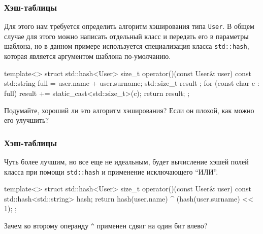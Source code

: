 \documentclass[compress, 8pt]{beamer}
\begin{document}
  \begin{frame}[fragile]

    \frametitle{Хэш-таблицы}

    Для этого нам требуется определить алгоритм хэширования
    типа \texttt{User}.
    В общем случае для этого можно написать отдельный класс и передать
    его в параметры шаблона, но в данном примере используется
    специализация класса \texttt{std::hash}, которая является
    аргументом шаблона по-умолчанию.

    \begin{mycppinplacelisting}
template<>
struct std::hash<User> {
    size_t operator()(const User& user) const {
        std::string full = user.name + user.surname;
        std::size_t result {};
        for (const char c : full) {
            result += static_cast<std::size_t>(c);
        }
        return result;
    }
};
    \end{mycppinplacelisting}

    \begin{task}
      Подумайте, хороший ли это алгоритм хэширования?
      Если он плохой, как можно его улучшить?
    \end{task}

  \end{frame}

  \begin{frame}[fragile]

    \frametitle{Хэш-таблицы}

    Чуть более лучшим, но все еще не идеальным, будет
    вычисление хэшей полей класса при помощи \texttt{std::hash}
    и применение исключающего \enquote{ИЛИ}.

    \begin{mycppinplacelisting}
template<>
struct std::hash<User> {
    size_t operator()(const User& user) const {
        std::hash<std::string> hash;
        return hash(user.name) ^ (hash(user.surname) << 1);
    }
};
    \end{mycppinplacelisting}

    \begin{task}
      Зачем ко второму операнду \verb|^| применен сдвиг на один бит
      влево?
    \end{task}

  \end{frame}
\end{document}
